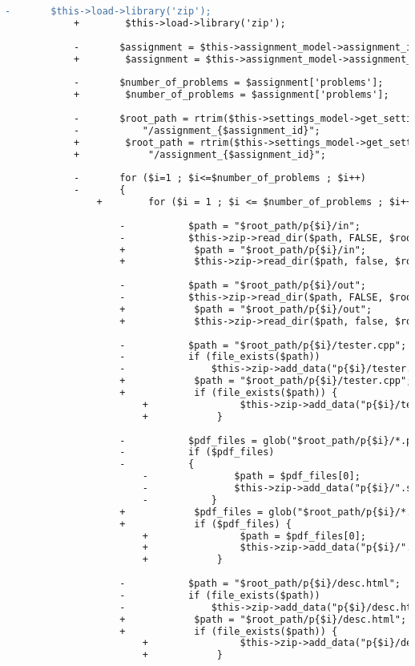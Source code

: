 \begin{lstlisting}[language=diff, caption=Perubahan pada kode Assignments.php]
			-		$this->load->library('zip');
			+        $this->load->library('zip');
			
			-		$assignment = $this->assignment_model->assignment_info($assignment_id);
			+        $assignment = $this->assignment_model->assignment_info($assignment_id);
			
			-		$number_of_problems = $assignment['problems'];
			+        $number_of_problems = $assignment['problems'];
			
			-		$root_path = rtrim($this->settings_model->get_setting('assignments_root'),'/').
			-			"/assignment_{$assignment_id}";
			+        $root_path = rtrim($this->settings_model->get_setting('assignments_root'), '/').
			+            "/assignment_{$assignment_id}";
			
			-		for ($i=1 ; $i<=$number_of_problems ; $i++)
			-		{
				+        for ($i = 1 ; $i <= $number_of_problems ; $i++) {
					
					-			$path = "$root_path/p{$i}/in";
					-			$this->zip->read_dir($path, FALSE, $root_path);
					+            $path = "$root_path/p{$i}/in";
					+            $this->zip->read_dir($path, false, $root_path);
					
					-			$path = "$root_path/p{$i}/out";
					-			$this->zip->read_dir($path, FALSE, $root_path);
					+            $path = "$root_path/p{$i}/out";
					+            $this->zip->read_dir($path, false, $root_path);
					
					-			$path = "$root_path/p{$i}/tester.cpp";
					-			if (file_exists($path))
					-				$this->zip->add_data("p{$i}/tester.cpp", file_get_contents($path));
					+            $path = "$root_path/p{$i}/tester.cpp";
					+            if (file_exists($path)) {
						+                $this->zip->add_data("p{$i}/tester.cpp", file_get_contents($path));
						+            }
					
					-			$pdf_files = glob("$root_path/p{$i}/*.pdf");
					-			if ($pdf_files)
					-			{
						-				$path = $pdf_files[0];
						-				$this->zip->add_data("p{$i}/".shj_basename($path), file_get_contents($path));
						-			}
					+            $pdf_files = glob("$root_path/p{$i}/*.pdf");
					+            if ($pdf_files) {
						+                $path = $pdf_files[0];
						+                $this->zip->add_data("p{$i}/".shj_basename($path), file_get_contents($path));
						+            }
					
					-			$path = "$root_path/p{$i}/desc.html";
					-			if (file_exists($path))
					-				$this->zip->add_data("p{$i}/desc.html", file_get_contents($path));
					+            $path = "$root_path/p{$i}/desc.html";
					+            if (file_exists($path)) {
						+                $this->zip->add_data("p{$i}/desc.html", file_get_contents($path));
						+            }
					

\end{lstlisting}
